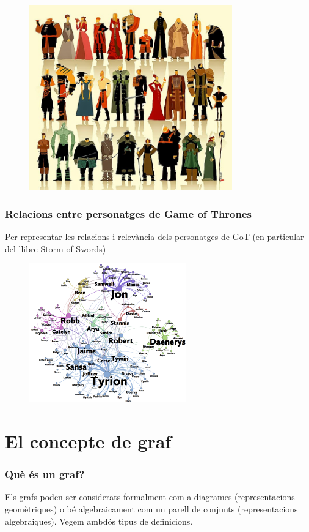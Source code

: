 \documentclass{beamer}
\begin{document}
\begin{frame}
\begin{figure}[h]
 \label{fig:volum}
\centering
\includegraphics[height=8cm]{got1}
\end{figure}
\end{frame}

\begin{frame}
\frametitle{Relacions entre personatges de Game of Thrones}
Per representar les relacions i relevància dels personatges de GoT (en particular del llibre Storm of Swords)

\begin{figure}[h]
 \label{fig:volum}
\centering
\includegraphics[height=6cm]{got2}
\end{figure}
\end{frame}

\section{El concepte de graf}


\begin{frame}
\frametitle{Què és un graf?}
Els grafs poden ser considerats formalment com a diagrames (representacions geomètriques) o bé algebraicament com un parell de conjunts (representacions algebraiques). Vegem ambdós tipus de definicions.
\end{frame}
\end{document}
